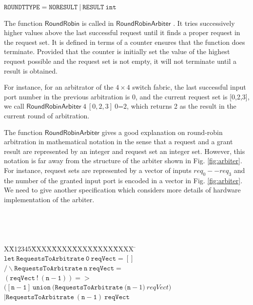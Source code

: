 \documentclass[final]{IEEEtran}
\newlength{\fminilength}
\newenvironment{fmini}[1][\linewidth]
  {\setlength{\fminilength}{#1\fboxsep-2\fboxrule}%
   \vspace{2ex}\noindent\begin{lrbox}{\fminibox}\begin{minipage}{\fminilength}%
   \mbox{ }\hfill\vspace{-2.5ex}}%
  {\end{minipage}\end{lrbox}\vspace{1ex}\hspace{0ex}%
   \framebox{\usebox{\fminibox}}}
\newenvironment{specification}
{\noindent\footnotesize\tt\begin{fmini}\begin{tabbing}X\=X12345\=XXXX\=XXXX\=XXXX\=XXXX\=XXXX
\=\+\kill} {\end{tabbing}\normalfont\end{fmini}}
\begin{document}
$\mathtt{ROUNDTTYPE= NORESULT\ |\ RESULT\ int}$

The function $\mathsf{RoundRobin}$ is called in $\mathsf{RoundRobinArbiter}$%
. It tries successively higher values above the last successful
request until it finds a proper request in the request set. It is
defined in terms of a counter ensures   that the function does
terminate. Provided that the counter is initially set the value of
the highest request possible and the request set is not empty, it
will not terminate until a result is obtained.

For instance, for an arbitrator of the $4\times 4$   switch fabric,
the last successful input port number in the previous arbitration is
0, and the current request set is [0,2,3], we call
$\mathsf{RoundRobinArbiter}\ 4\ [0,2,3]\ 0$=$2$, which returns 2 as
the result in the current round of arbitration.

The function $\mathsf{RoundRobinArbiter}$ gives a good explanation
on round-robin arbitration in mathematical notation in the sense
that a request and a grant result are represented by an integer and
request set an integer set. However, this notation is far away from
the structure of the arbiter shown in Fig. \ref{fig:arbiter}. For
instance, request sets are represented by a vector of inputs $req_0
--req_3$ and the number of the  granted input port is encoded in a
vector in Fig. \ref{fig:arbiter}. We need to give another specification
which considers more details of hardware implementation of the
arbiter.

 \vspace{2mm}
 {\footnotesize
\begin{specification}
$\mathtt{let\ RequestsToArbitrate\ 0\ reqVect=[]}$\\

$\mathtt{/\backslash RequestsToArbitrate\ n\ reqVect=}$\\

\>$\mathtt{ (reqVect\ !\ (n-1))=>}$\\

\>$\mathtt{([n-1]\ union\ (RequestsToArbitrate\ (n-}1)\
reqVect)$\\

\>$\mathtt{  |RequestsToArbitrate\ (n-1)\ reqVect}$
\end{specification}}
\end{document}

